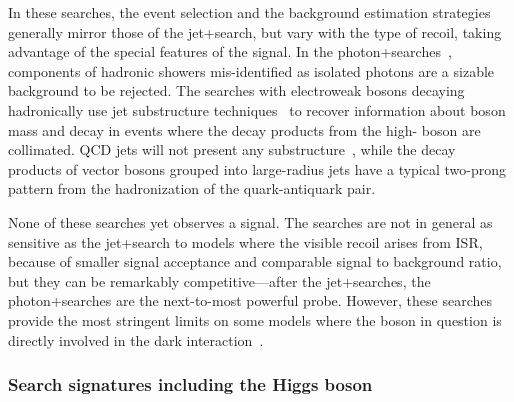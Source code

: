 In these searches, the event selection and the background estimation strategies generally mirror those of the jet+\MET search, but vary with the type of recoil, taking advantage of the special features of the signal.
In the photon+\MET searches~\cite{Aaboud:2017dor,CMS-PAS-EXO-16-014}, components of hadronic showers mis-identified as isolated photons are a sizable background to be rejected.
The searches with electroweak bosons decaying hadronically use jet substructure techniques~\cite{Sirunyan:2017jix,Aaboud:2016qgg} to recover information about boson mass and decay in events where the decay products from the high-\pt{} boson are collimated.
QCD jets will not present any substructure~\cite{Larkoski:2017jix}, while the decay products of vector bosons grouped into large-radius jets have a typical two-prong pattern from the hadronization of the quark-antiquark pair.

None of these searches yet observes a signal. The searches are not in general as sensitive as the jet+\MET search to models where the visible recoil arises from ISR, because of smaller signal acceptance and comparable signal to background ratio, but they can be remarkably competitive---after the jet+\MET searches, the photon+\MET searches are the next-to-most powerful probe.
However, these searches provide the most stringent limits on some models where the boson in question is directly involved in the dark interaction~\cite{Berlin:2014cfa}.%

\subsubsection{Search signatures including the Higgs boson}


